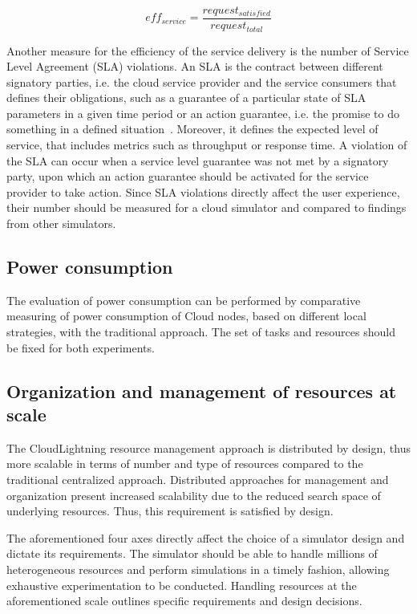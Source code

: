 \begin{equation}
eff_{service} = \frac{request_{satisfied}}{request_{total}}
\end{equation}

Another measure for the efficiency of the service delivery is the number of Service Level Agreement (SLA) violations. An SLA is the contract between different signatory parties, i.e.
the cloud service provider and the service consumers that defines their obligations, such as a guarantee of a particular state of SLA parameters in a given time period or an action guarantee, i.e. the promise to do something in a defined situation~\cite{ludwig2003web}. Moreover, it defines the expected level of service, that includes metrics such as throughput or response time. A violation of the SLA can occur when a service level guarantee was not met by a signatory party, upon which an action guarantee should be activated for the service provider to take action. Since SLA violations directly affect the user experience, their number should be measured for a cloud simulator and compared to findings from other simulators.

\subsection{Power consumption}

The evaluation of power consumption can be performed by comparative measuring of power consumption of Cloud nodes, based on different local strategies, with the traditional approach. The set of tasks and resources should be fixed for both experiments.


\subsection{Organization and management of resources at scale}

The CloudLightning resource management approach is distributed by design, thus more scalable in terms of number and type of resources compared to the traditional centralized approach. Distributed approaches for management and organization present increased scalability due to the reduced search space of underlying resources. Thus, this requirement is satisfied by design.

The aforementioned four axes directly affect the choice of a simulator design and dictate its requirements. The simulator should be able to handle millions of heterogeneous resources and perform simulations in a timely fashion, allowing exhaustive experimentation to be conducted. Handling resources at the aforementioned scale outlines specific requirements and design decisions.

